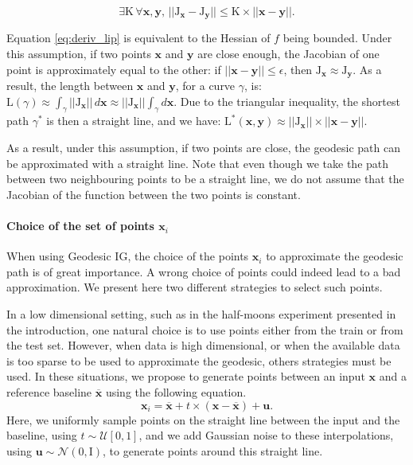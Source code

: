 \begin{equation}
    \exists \textrm{K} \, \forall \textbf{x}, \textbf{y}, \, ||\textrm{J}_{\textbf{x}} - \textrm{J}_{\textbf{y}}|| \leq \textrm{K} \times ||\textbf{x} - \textbf{y}||.
\label{eq:deriv_lip}
\end{equation}

Equation \ref{eq:deriv_lip} is equivalent to the Hessian of $f$ being bounded. Under this assumption, if two points $\textbf{x}$ and $\textbf{y}$ are close enough, the Jacobian of one point is approximately equal to the other: if $||\textbf{x} - \textbf{y}|| \le \epsilon$, then $\textrm{J}_{\textbf{x}} \approx \textrm{J}_{\textbf{y}}$. As a result, the length between $\textbf{x}$ and $\textbf{y}$, for a curve $\gamma$, is: $\textrm{L}(\gamma) \approx \int_{\gamma} ||\textrm{J}_{\textbf{x}}|| \, d\textbf{x} \approx ||\textrm{J}_{\textbf{x}}|| \int_{\gamma} d\textbf{x}$. Due to the triangular inequality, the shortest path $\gamma^*$ is then a straight line, and we have: $\textrm{L}^*(\textbf{x}, \textbf{y}) \approx ||\textrm{J}_{\textbf{x}}|| \times ||\textbf{x} - \textbf{y}||$.

As a result, under this assumption, if two points are close, the geodesic path can be approximated with a straight line. Note that even though we take the path between two neighbouring points to be a straight line, we do not assume that the Jacobian of the function between the two points is constant. 

\paragraph{Choice of the set of points $\textbf{x}_i$}

When using Geodesic IG, the choice of the points $\textbf{x}_i$ to approximate the geodesic path is of great importance. A wrong choice of points could indeed lead to a bad approximation. We present here two different strategies to select such points.

In a low dimensional setting, such as in the half-moons experiment presented in the introduction, one natural choice is to use points either from the train or from the test set. However, when data is high dimensional, or when the available data is too sparse to be used to approximate the geodesic, others strategies must be used. In these situations, we propose to generate points between an input $\textbf{x}$ and a reference baseline $\overline{\textbf{x}}$ using the following equation. 
\begin{equation}
    \textbf{x}_i = \overline{\textbf{x}} + t \times (\textbf{x} - \overline{\textbf{x}}) + \textbf{u}.
\label{eq:guide}
\end{equation} 
Here, we uniformly sample points on the straight line between the input and the baseline, using $t \sim \mathcal{U}[0, 1]$, and we add Gaussian noise to these interpolations, using $\textbf{u} \sim \mathcal{N}(0, \textrm{I})$, to generate points around this straight line. 

